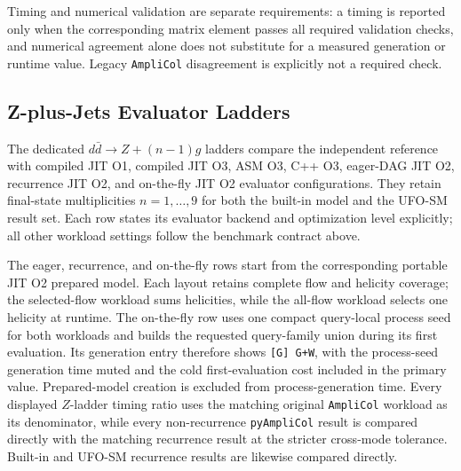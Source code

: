 \documentclass[10pt,letterpaper]{article}
\newif\ifReportLandscapePage
\newcommand{\PAC}{\texttt{pyAmpliCol}}
\newcommand{\AC}{\texttt{AmpliCol}}
\begin{document}
Timing and numerical validation are separate requirements: a timing is
reported only when the corresponding matrix element passes all required
validation checks, and numerical agreement alone does not substitute for a
measured generation or runtime value. Legacy \AC{} disagreement is explicitly
not a required check.

\clearpage
\begin{landscape}
\ReportLandscapePagetrue
\pagestyle{empty}

\end{landscape}
\ReportLandscapePagefalse
\clearpage
\pagestyle{empty}
\begin{landscape}
\ReportLandscapePagetrue
\section{Z-plus-Jets Evaluator Ladders}

The dedicated $d\bar d\to Z+(n-1)g$ ladders compare the independent reference
with compiled JIT O1, compiled JIT O3, ASM O3, C++ O3, eager-DAG JIT O2,
recurrence JIT O2, and on-the-fly JIT O2 evaluator configurations. They retain
final-state multiplicities $n=1,\ldots,9$ for both the built-in model and
the UFO-SM result set. Each row states its evaluator backend
and optimization level explicitly; all other workload settings follow the
benchmark contract above.

The eager, recurrence, and on-the-fly rows start from the corresponding
portable JIT O2 prepared model. Each layout retains complete flow and helicity
coverage; the selected-flow workload sums helicities, while the all-flow
workload selects one helicity at runtime. The on-the-fly row uses one compact
query-local process seed for both workloads and builds the requested
query-family union during its first evaluation. Its generation entry therefore
shows \texttt{[G] G+W}, with the process-seed generation time muted and the cold
first-evaluation cost included in the primary value. Prepared-model creation is
excluded from process-generation time. Every displayed \(Z\)-ladder timing
ratio uses the matching original \AC{} workload as its denominator, while every
non-recurrence \PAC{} result is compared directly with the matching recurrence
result at the stricter cross-mode tolerance. Built-in and UFO-SM recurrence
results are likewise compared directly.


\end{landscape}
\end{document}
